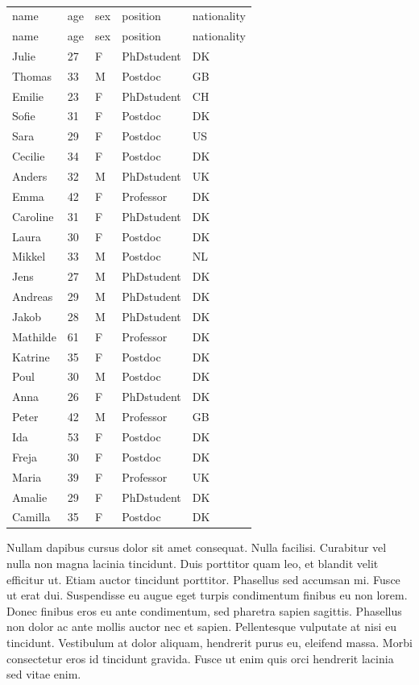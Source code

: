 \documentclass[
  a4paper,
]{scrbook}
\begin{document}
\begin{longtable}[]{@{}lllll@{}}

\caption{\label{tbl-subjects}People included in the analysis.}

\tabularnewline

\caption{}\label{T_e468d}\tabularnewline
\toprule\noalign{}
name & age & sex & position & nationality \\
\midrule\noalign{}
\endfirsthead
\toprule\noalign{}
name & age & sex & position & nationality \\
\midrule\noalign{}
\endhead
\bottomrule\noalign{}
\endlastfoot
Julie & 27 & F & PhDstudent & DK \\
Thomas & 33 & M & Postdoc & GB \\
Emilie & 23 & F & PhDstudent & CH \\
Sofie & 31 & F & Postdoc & DK \\
Sara & 29 & F & Postdoc & US \\
Cecilie & 34 & F & Postdoc & DK \\
Anders & 32 & M & PhDstudent & UK \\
Emma & 42 & F & Professor & DK \\
Caroline & 31 & F & PhDstudent & DK \\
Laura & 30 & F & Postdoc & DK \\
Mikkel & 33 & M & Postdoc & NL \\
Jens & 27 & M & PhDstudent & DK \\
Andreas & 29 & M & PhDstudent & DK \\
Jakob & 28 & M & PhDstudent & DK \\
Mathilde & 61 & F & Professor & DK \\
Katrine & 35 & F & Postdoc & DK \\
Poul & 30 & M & Postdoc & DK \\
Anna & 26 & F & PhDstudent & DK \\
Peter & 42 & M & Professor & GB \\
Ida & 53 & F & Postdoc & DK \\
Freja & 30 & F & Postdoc & DK \\
Maria & 39 & F & Professor & UK \\
Amalie & 29 & F & PhDstudent & DK \\
Camilla & 35 & F & Postdoc & DK \\

\end{longtable}

Nullam dapibus cursus dolor sit amet consequat. Nulla facilisi.
Curabitur vel nulla non magna lacinia tincidunt. Duis porttitor quam
leo, et blandit velit efficitur ut. Etiam auctor tincidunt porttitor.
Phasellus sed accumsan mi. Fusce ut erat dui. Suspendisse eu augue eget
turpis condimentum finibus eu non lorem. Donec finibus eros eu ante
condimentum, sed pharetra sapien sagittis. Phasellus non dolor ac ante
mollis auctor nec et sapien. Pellentesque vulputate at nisi eu
tincidunt. Vestibulum at dolor aliquam, hendrerit purus eu, eleifend
massa. Morbi consectetur eros id tincidunt gravida. Fusce ut enim quis
orci hendrerit lacinia sed vitae enim.
\end{document}
